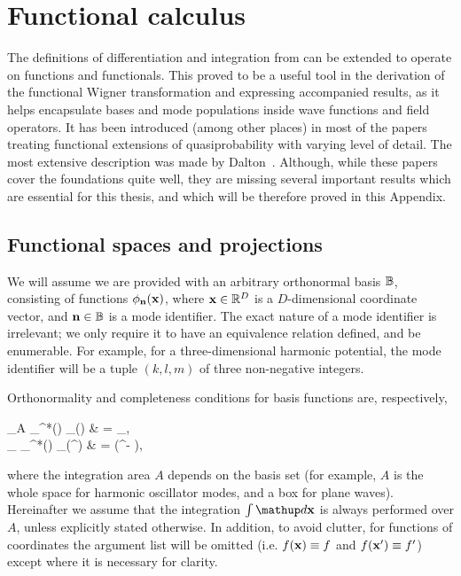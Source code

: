 \chapter{Functional calculus}
\label{cha:appendix:func-calculus}

The definitions of differentiation and integration from  can be extended to operate on functions and functionals.
This proved to be a useful tool in the derivation of the functional Wigner transformation and expressing accompanied results, as it helps encapsulate bases and mode populations inside wave functions and field operators.
It has been introduced (among other places) in most of the papers treating functional extensions of quasiprobability with varying level of detail.
The most extensive description was made by Dalton~\cite{Dalton2011}.
Although, while these papers cover the foundations quite well, they are missing several important results which are essential for this thesis, and which will be therefore proved in this Appendix.


\section{Functional spaces and projections}

We will assume we are provided with an arbitrary orthonormal basis $\mathbb{B}$, consisting of functions $\phi_{\mathbf{n}}(\mathbf{x})$, where $\mathbf{x} \in \mathbb{R}^D$ is a $D$-dimensional coordinate vector, and $\mathbf{n} \in \mathbb{B}$ is a mode identifier.
The exact nature of a mode identifier is irrelevant; we only require it to have an equivalence relation defined, and be enumerable.
For example, for a three-dimensional harmonic potential, the mode identifier will be a tuple $(k,l,m)$ of three non-negative integers.

Orthonormality and completeness conditions for basis functions are, respectively,
\begin{eqns}
\label{eqn:func-calculus:basis}
	\int\limits_A \phi_{\nvec}^*(\xvec) \phi_{\mvec}(\xvec) \upd\xvec
	& = \delta_{\nvec\mvec}, \\
	\sum_{\nvec \in \fullbasis} \phi_{\nvec}^*(\xvec) \phi_{\nvec}(\xvec^\prime)
	& = \delta(\xvec^\prime - \xvec),
\end{eqns}
where the integration area $A$ depends on the basis set (for example, $A$ is the whole space for harmonic oscillator modes, and a box for plane waves).
Hereinafter we assume that the integration $\int \upd\xvec$ is always performed over $A$, unless explicitly stated otherwise. In addition, to avoid clutter, for functions of coordinates the argument list will be omitted (i.e. $f(\mathbf{x}) \equiv f$ and $f(\mathbf{x}^\prime) \equiv f^\prime$) except where it is necessary for clarity.

